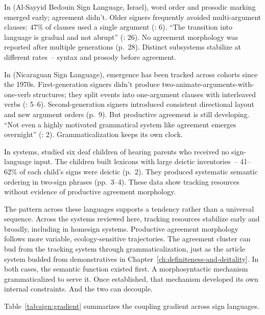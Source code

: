 In  (Al-Sayyid Bedouin Sign Language, Israel), word order and prosodic marking emerged early; agreement didn't. Older signers frequently avoided multi-argument clauses: 47\% of clauses used a single argument (\citealt{sandler2005}: 6). \enquote{The transition into language is gradual and not abrupt} (\citealt{sandler2005}: 26). No agreement morphology was reported after multiple generations (p.~28). Distinct subsystems stabilize at different rates~-- syntax and prosody before agreement.

In  (Nicaraguan Sign Language), emergence has been tracked across cohorts since the 1970s. First-generation signers didn't produce two-animate-arguments-with-one-verb structures; they split events into one-argument clauses with interleaved verbs (\citealt{senghas1997}: 5--6). Second-generation signers introduced consistent directional layout and new argument orders (p.~9). But productive agreement is still developing. \enquote{Not even a highly motivated grammatical system like agreement emerges overnight} (\citealt{padden2010}: 2). Grammaticalization keeps its own clock.

In  systems, \textcite{goldinmeadow1977} studied six deaf children of hearing parents who received no sign-language input. The children built lexicons with large deictic inventories~-- 41--62\% of each child's signs were deictic (p.~2). They produced systematic semantic ordering in two-sign phrases (pp.~3--4). These data show tracking resources without evidence of productive agreement morphology.

The pattern across these languages supports a tendency rather than a universal sequence. Across the systems reviewed here, tracking resources stabilize early and broadly, including in homesign systems. Productive agreement morphology follows more variable, ecology-sensitive trajectories. The agreement cluster can bud from the tracking system through grammaticalization, just as the article system budded from demonstratives in Chapter~\ref{ch:definiteness-and-deitality}. In both cases, the semantic function existed first. A morphosyntactic mechanism grammaticalized to serve it. Once established, that mechanism developed its own internal constraints. And the two can decouple.

Table~\ref{tab:sign:gradient} summarizes the coupling gradient across sign languages.

